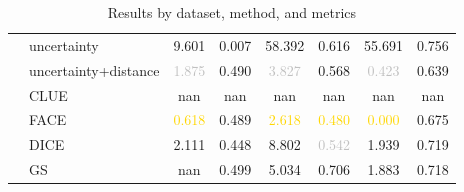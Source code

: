 \begin{table}[ht]
\begin{tabular}{l l c c c c c c}
 & uncertainty & 9.601 & 0.007 & 58.392 & 0.616 & 55.691 & 0.756 \\
 & uncertainty+distance & \textcolor{silver}{1.875} & 0.490 & \textcolor{silver}{3.827} & \textcolor{bronze}{0.568} & \textcolor{silver}{0.423} & 0.639 \\
 & CLUE & nan & nan & nan & nan & nan & nan \\
 & FACE & \textcolor{gold}{0.618} & 0.489 & \textcolor{gold}{2.618} & \textcolor{gold}{0.480} & \textcolor{gold}{0.000} & 0.675 \\
 & DICE & \textcolor{bronze}{2.111} & 0.448 & 8.802 & \textcolor{silver}{0.542} & 1.939 & 0.719 \\
 & GS & nan & 0.499 & \textcolor{bronze}{5.034} & 0.706 & \textcolor{bronze}{1.883} & 0.718 \\
\hline
\end{tabular}
\caption{Results by dataset, method, and metrics}
\label{tab:results}
\end{table}
